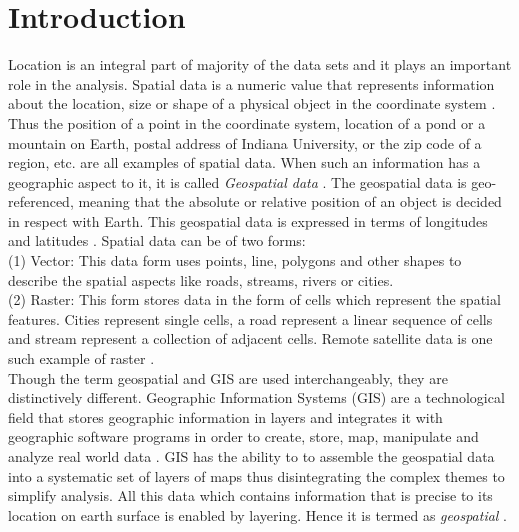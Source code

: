 \section{Introduction}
Location is an integral part of majority of the data sets and it plays an important role in the analysis. Spatial data is a numeric value that represents information about the location, size or shape of a physical object in the coordinate system \cite{link1}. Thus the position of a point in the coordinate system, location of a pond or a mountain on Earth, postal address of Indiana University, or the zip code of a region, etc. are all examples of spatial data. When such an information has a geographic aspect to it, it is called \emph{Geospatial data} \cite{link2}. The geospatial data is geo-referenced, meaning that the absolute or relative position of an object is decided in respect with Earth. This geospatial data is expressed in terms of longitudes and latitudes \cite{link1}. Spatial data can be of two forms:\\ (1) Vector: This data form uses points, line, polygons and other shapes to describe the spatial aspects like roads, streams, rivers or cities. \\ (2) Raster: This form stores data in the form of cells which represent the spatial features. Cities represent single cells, a road represent a linear sequence of cells and stream represent a collection of adjacent cells. Remote satellite data is one such example of raster \cite{link2}.\\
Though the term geospatial and GIS are used interchangeably, they are distinctively different. Geographic Information Systems (GIS) are a technological field that stores geographic information in layers and integrates it with geographic software programs in order to create, store, map, manipulate and analyze real world data \cite{link3}. GIS has the ability to to assemble the geospatial data into a systematic set of layers of maps thus disintegrating the complex themes to simplify analysis. All this data which contains information that is precise to its location on earth surface is enabled by layering. Hence it is termed as \emph{geospatial} \cite{link6}. 

